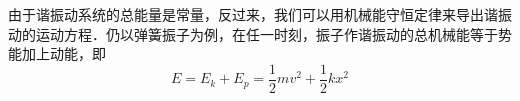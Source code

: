 

由于谐振动系统的总能量是常量，反过来，我们可以用机械能守恒定律来导出谐振动的运动方程．仍以弹簧振子为例，在任一时刻，振子作谐振动的总机械能等于势能加上动能，即
\begin{equation}
E=E_k+E_p=\frac{1}{2} m v^{2}+\frac{1}{2} k x^{2}
\end{equation}
